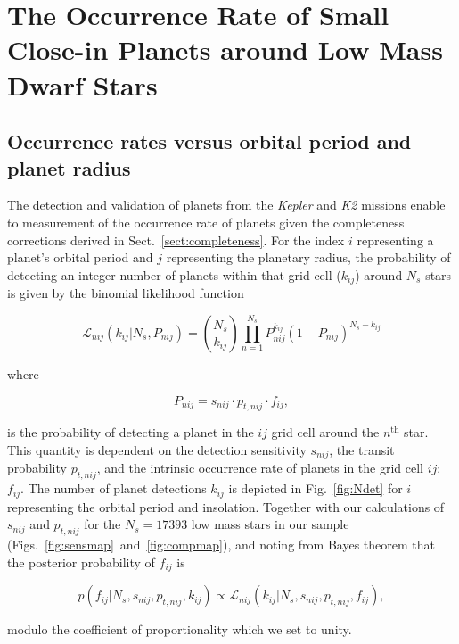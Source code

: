 \documentclass[twocolumn]{emulateapj}
\newcommand{\kepler}[1]{\emph{Kepler}#1}
\newcommand{\ktwo}[1]{\emph{K2}#1}
\begin{document}
\section{The Occurrence Rate of Small Close-in Planets around Low Mass Dwarf Stars} \label{sect:occurrence}
\subsection{Occurrence rates versus orbital period and planet radius}
The detection and validation of planets from the \kepler{} and \ktwo{} missions enable to measurement of the
occurrence rate of planets given the completeness corrections derived in Sect.~\ref{sect:completeness}.
For the index $i$ representing a planet's orbital period and $j$ representing the planetary
radius, the probability of detecting an integer number of planets within that grid cell ($k_{ij}$) around
$N_s$ stars is given by the binomial likelihood function

\begin{equation}
  \mathcal{L}_{nij}(k_{ij}|N_s,P_{nij}) = \binom{N_s}{k_{ij}} \prod_{n=1}^{N_s} P_{nij}^{k_{ij}} (1-P_{nij})^{N_s-k_{ij}}
  \label{eq:lnL}
\end{equation}

\noindent where

\begin{equation}
  P_{nij} = s_{nij} \cdot p_{t,nij} \cdot f_{ij},
  \label{eq:prob}
\end{equation}

\noindent is the probability of detecting a planet in the $ij$ grid cell around the $n^{\text{th}}$ star.
This quantity is dependent on the detection sensitivity $s_{nij}$, the transit probability $p_{t,nij}$, and the 
intrinsic occurrence rate of planets in the grid cell $ij$: $f_{ij}$.
The number of planet detections $k_{ij}$ is depicted in Fig.~\ref{fig:Ndet} for $i$ representing the
orbital period and insolation. Together with our calculations of $s_{nij}$ and $p_{t,nij}$ for the $N_s=17393$
low mass stars in our sample (Figs.~\ref{fig:sensmap}~and~\ref{fig:compmap}), and noting from Bayes theorem
that the posterior probability of $f_{ij}$ is 

\begin{equation}
  p(f_{ij}|N_s,s_{nij},p_{t,nij},k_{ij}) \propto \mathcal{L}_{nij}(k_{ij}|N_s,s_{nij},p_{t,nij},f_{ij}),
\end{equation}
  
\noindent modulo the coefficient of proportionality which we set to unity.
\end{document}
